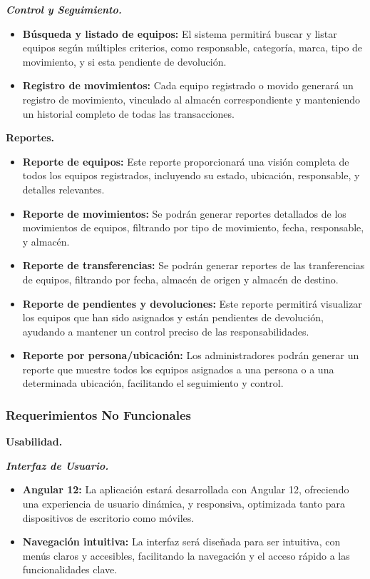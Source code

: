 \documentclass[stu, 12pt, letterpaper, donotrepeattitle, floatsintext, natbib]{apa7}
\begin{document}
\textit{\textbf{Control y Seguimiento.}}
\begin{itemize}
    \item\textbf{Búsqueda y listado de equipos: }El sistema permitirá buscar y listar equipos según múltiples criterios, como responsable,
          categoría, marca, tipo de movimiento, y si esta pendiente de devolución.
    \item\textbf{Registro de movimientos: }Cada equipo registrado o movido generará un registro de movimiento, vinculado al almacén
          correspondiente y manteniendo un historial completo de todas las transacciones.
\end{itemize}

\textbf{Reportes.}
\begin{itemize}
    \item\textbf{Reporte de equipos: }Este reporte proporcionará una visión completa de todos los equipos registrados, incluyendo su estado,
          ubicación, responsable, y detalles relevantes.
    \item\textbf{Reporte de movimientos: }Se podrán generar reportes detallados de los movimientos de equipos, filtrando por tipo de movimiento,
          fecha, responsable, y almacén.
    \item\textbf{Reporte de transferencias: }Se podrán generar reportes de las tranferencias de equipos, filtrando por fecha, almacén de origen
          y almacén de destino.
    \item\textbf{Reporte de pendientes y devoluciones: }Este reporte permitirá visualizar los equipos que han sido asignados y están pendientes
          de devolución, ayudando a mantener un control preciso de las responsabilidades.
    \item\textbf{Reporte por persona/ubicación: }Los administradores podrán generar un reporte que muestre todos los equipos asignados a una
          persona o a una determinada ubicación, facilitando el seguimiento y control.
\end{itemize}
\subsubsection{Requerimientos No Funcionales}
\textbf{Usabilidad.}

\textit{\textbf{Interfaz de Usuario.}}
\begin{itemize}
    \item\textbf{Angular 12: }La aplicación estará desarrollada con Angular 12, ofreciendo una experiencia de usuario dinámica, y responsiva,
          optimizada tanto para dispositivos de escritorio como móviles.
    \item\textbf{Navegación intuitiva: }La interfaz será diseñada para ser intuitiva, con menús claros y accesibles, facilitando la navegación
          y el acceso rápido a las funcionalidades clave.
\end{itemize}
\end{document}
